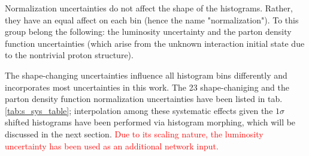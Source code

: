 Normalization uncertainties do not affect the shape of the histograms. Rather, they have an equal affect on each bin (hence the name "normalization"). To this group belong the following: the luminosity uncertainty and the parton density function uncertainties (which arise from the unknown interaction initial state due to the nontrivial proton structure).

The shape-changing uncertainties influence all histogram bins differently and incorporates most uncertainties in this work. The 23 shape-chaniging and the parton density function normalization uncertainties have been listed in tab. \ref{tab:s_sys_table}; interpolation among these systematic effects given the $1\sigma$ shifted histograms have been performed via histogram morphing, which will be discussed in the next section. \textcolor{red}{Due to its scaling nature, the luminosity uncertainty has been used as an additional network input.}

